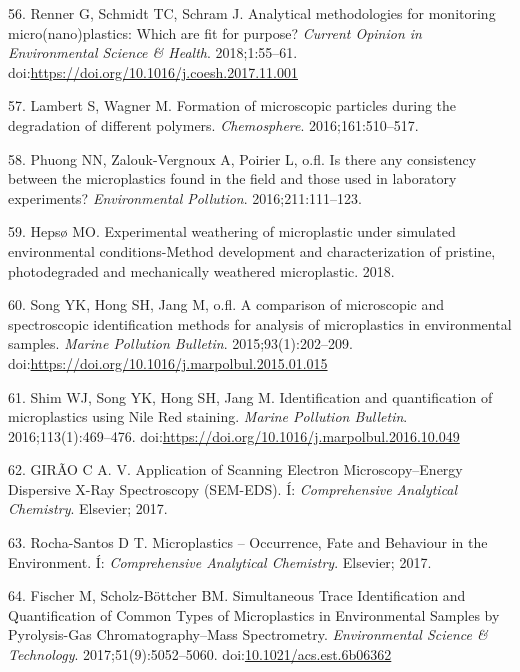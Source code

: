 \documentclass[icelandic,]{book}
\begin{document}
\leavevmode\hypertarget{ref-RENNER201855}{}%
56. Renner G, Schmidt TC, Schram J. Analytical methodologies for monitoring micro(nano)plastics: Which are fit for purpose? \emph{Current Opinion in Environmental Science \& Health}. 2018;1:55--61.\\ doi:\href{https://doi.org/10.1016/j.coesh.2017.11.001}{https://doi.org/10.1016/j.coesh.2017.11.001}

\leavevmode\hypertarget{ref-lambert2016formation}{}%
57. Lambert S, Wagner M. Formation of microscopic particles during the degradation of different polymers. \emph{Chemosphere}. 2016;161:510--517.

\leavevmode\hypertarget{ref-phuong2016there}{}%
58. Phuong NN, Zalouk-Vergnoux A, Poirier L, o.fl. Is there any consistency between the microplastics found in the field and those used in laboratory experiments? \emph{Environmental Pollution}. 2016;211:111--123.

\leavevmode\hypertarget{ref-hepso2018experimental}{}%
59. Hepsø MO. Experimental weathering of microplastic under simulated environmental conditions-Method development and characterization of pristine, photodegraded and mechanically weathered microplastic. 2018.

\leavevmode\hypertarget{ref-SONG2015202}{}%
60. Song YK, Hong SH, Jang M, o.fl. A comparison of microscopic and spectroscopic identification methods for analysis of microplastics in environmental samples. \emph{Marine Pollution Bulletin}. 2015;93(1):202--209. doi:\href{https://doi.org/https://doi.org/10.1016/j.marpolbul.2015.01.015}{https://doi.org/10.1016/j.marpolbul.2015.01.015}

\leavevmode\hypertarget{ref-SHIM2016469}{}%
61. Shim WJ, Song YK, Hong SH, Jang M. Identification and quantification of microplastics using Nile Red staining. \emph{Marine Pollution Bulletin}. 2016;113(1):469--476. doi:\href{https://doi.org/https://doi.org/10.1016/j.marpolbul.2016.10.049}{https://doi.org/10.1016/j.marpolbul.2016.10.049}

\leavevmode\hypertarget{ref-bitam2014bio2}{}%
62. GIRÃO C A. V. Application of Scanning Electron Microscopy--Energy Dispersive X-Ray Spectroscopy (SEM-EDS). Í: \emph{Comprehensive Analytical Chemistry}. Elsevier; 2017.

\leavevmode\hypertarget{ref-k22014bio2}{}%
63. Rocha-Santos D T. Microplastics -- Occurrence, Fate and Behaviour in the Environment. Í: \emph{Comprehensive Analytical Chemistry}. Elsevier; 2017.

\leavevmode\hypertarget{ref-Fischer2017}{}%
64. Fischer M, Scholz-Böttcher BM. Simultaneous Trace Identification and Quantification of Common Types of Microplastics in Environmental Samples by Pyrolysis-Gas Chromatography--Mass Spectrometry. \emph{Environmental Science \& Technology}. 2017;51(9):5052--5060. doi:\href{https://doi.org/10.1021/acs.est.6b06362}{10.1021/acs.est.6b06362}
\end{document}

